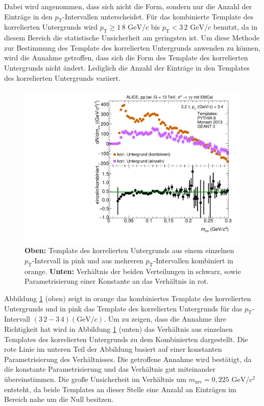 Dabei wird angenommen, dass sich nicht die Form, sondern nur die Anzahl der Einträge in den $p_\text{T}$-Intervallen unterscheidet.  
Für das kombinierte Template des korrelierten Untergrunds wird $p_\text{T} \geq 1\,8\text{ GeV}/c$ bis $p_\text{T} < 3\,2\text{ GeV}/c$ benutzt, da in diesem Bereich die statistische Unsicherheit am geringsten ist.
Um diese Methode zur Bestimmung des Template des korrelierten Untergrunds anwenden zu können, wird die Annahme getroffen, dass sich die Form des Template des korrelierten Untergrunds nicht ändert.
Lediglich die Anzahl der Einträge in den Templates des korrelierten Untergrunds variiert.
\begin{figure}[t!]
\centering
\includegraphics[width=.7\linewidth]{BackgroundWithRatio10_Data_2016.pdf}
\caption{\textbf{Oben:} Template des korrelierten Untergrunds aus einem einzelnen $p_\text{T}$-Intervall in pink und aus mehreren $p_\text{T}$-Intervallen kombiniert in orange.
\textbf{Unten:} Verhältnis der beiden Verteilungen in schwarz, sowie Parametrisierung einer Konstante an das Verhältnis in rot.}
\label{fig:BkgTempRatio}
\end{figure}
\newline
Abbildung \ref{fig:BkgTempRatio} (oben) zeigt in orange das kombiniertes Template des korrelierten Untergrunds und in pink das Template des korrelierten Untergrunds für das $p_\text{T}$-Intervall $(3\,2 - 3\,4) (\text{GeV/}c)$.
Um zu zeigen, dass die Annahme ihre Richtigkeit hat wird in Abbildung \ref{fig:BkgTempRatio} (unten) das Verhältnis aus einzelnen Templates des korrelierten Untergrunds zu dem Kombinierten dargestellt.
Die rote Linie im unteren Teil der Abbildung basiert auf einer konstanten Parametrisierung des Verhältnisses.
Die getroffene Annahme wird bestätigt, da die konstante Parametrisierung und das Verhältnis gut miteinander übereinstimmen.
Die große Unsicherheit im Verhältnis um $m_\text{inv} = 0,225\text{ GeV}/c^{2}$ entsteht, da beide Templates an dieser Stelle eine Anzahl an Einträgen im Bereich nahe um die Null besitzen.

